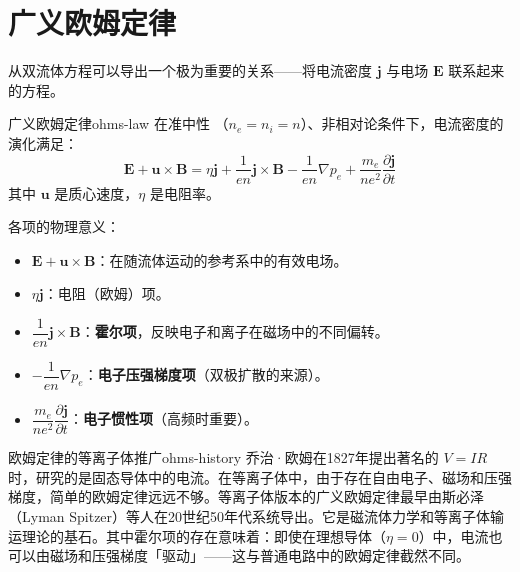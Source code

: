 \documentclass[12pt,a4paper,openany,oneside]{book}
\newcommand{\diffmarktext}[1]{%
  \textcolor{coverMid!80}{\rule[-0.1em]{2pt}{0.9em}}\,%
  \textcolor{coverMid}{\footnotesize\textbf{[#1]}}%
}
\newcommand{\difficulty}[1]{\marginnote{\raggedright\diffmarktext{#1}}}
\newcommand{\vect}[1]{\bm{#1}}
\newcommand{\grad}{\nabla}
\begin{document}
\section{广义欧姆定律}\difficulty{提高}
\label{sec:ch4-ohm}

从双流体方程可以导出一个极为重要的关系——将电流密度 $\vect{j}$ 与电场 $\vect{E}$ 联系起来的方程。

\begin{theorem}{广义欧姆定律}{ohms-law}
在准中性 （$n_e = n_i = n$）、非相对论条件下，电流密度的演化满足：
\[
\vect{E} + \vect{u}\times\vect{B} = \eta\vect{j} + \frac{1}{en}\vect{j}\times\vect{B} - \frac{1}{en}\grad p_e + \frac{m_e}{n e^2}\frac{\partial\vect{j}}{\partial t}
\]
其中 $\vect{u}$ 是质心速度，$\eta$ 是电阻率。

各项的物理意义：
\begin{itemize}
\item $\vect{E} + \vect{u}\times\vect{B}$：在随流体运动的参考系中的有效电场。
\item $\eta\vect{j}$：电阻（欧姆）项。
\item $\dfrac{1}{en}\vect{j}\times\vect{B}$：\textbf{霍尔项}，反映电子和离子在磁场中的不同偏转。
\item $-\dfrac{1}{en}\grad p_e$：\textbf{电子压强梯度项}（双极扩散的来源）。
\item $\dfrac{m_e}{ne^2}\dfrac{\partial\vect{j}}{\partial t}$：\textbf{电子惯性项}（高频时重要）。
\end{itemize}
\end{theorem}

\begin{history}{欧姆定律的等离子体推广}{ohms-history}
乔治·欧姆在1827年提出著名的 $V=IR$ 时，研究的是固态导体中的电流。在等离子体中，由于存在自由电子、磁场和压强梯度，简单的欧姆定律远远不够。等离子体版本的广义欧姆定律最早由斯必泽（Lyman Spitzer）等人在20世纪50年代系统导出。它是磁流体力学和等离子体输运理论的基石。其中霍尔项的存在意味着：即使在理想导体（$\eta=0$）中，电流也可以由磁场和压强梯度「驱动」——这与普通电路中的欧姆定律截然不同。
\end{history}
\end{document}
